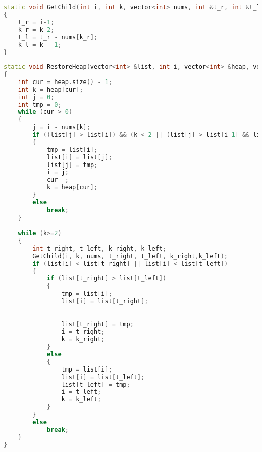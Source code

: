         \begin{lstlisting}[language=C++, label=lst:sort:GetChild, caption=Функция получения идексов в куче чисел Леонардо]
static void GetChild(int i, int k, vector<int> nums, int &t_r, int &t_l, int &k_r, int &k_l)
{
    t_r = i-1;
    k_r = k-2;
    t_l = t_r - nums[k_r];
    k_l = k - 1;
}
        \end{lstlisting}

        \begin{lstlisting}[language=C++, label=lst:sort:RestoreHeap, caption=Функция пересоздания кучи куч чисел Леонардо]
static void RestoreHeap(vector<int> &list, int i, vector<int> &heap, vector<int> &nums)
{
    int cur = heap.size() - 1;
    int k = heap[cur];
    int j = 0;
    int tmp = 0;
    while (cur > 0)
    {
        j = i - nums[k];
        if ((list[j] > list[i]) && (k < 2 || (list[j] > list[i-1] && list[j] > list[i-2])))
        {
            tmp = list[i];
            list[i] = list[j];
            list[j] = tmp;
            i = j;
            cur--;
            k = heap[cur];
        }
        else
            break;
    }

    while (k>=2)
    {
        int t_right, t_left, k_right, k_left;
        GetChild(i, k, nums, t_right, t_left, k_right,k_left);
        if (list[i] < list[t_right] || list[i] < list[t_left])
        {
            if (list[t_right] > list[t_left])
            {
                tmp = list[i];
                list[i] = list[t_right];
        \end{lstlisting}

        \begin{lstlisting}[language=C++, label=lst:sort:RestoreHeap, caption=Функция пересоздания кучи куч чисел Леонардо]

                list[t_right] = tmp;
                i = t_right;
                k = k_right;
            }
            else
            {
                tmp = list[i];
                list[i] = list[t_left];
                list[t_left] = tmp;
                i = t_left;
                k = k_left;
            }
        }
        else
            break;
    }
}
        \end{lstlisting}


